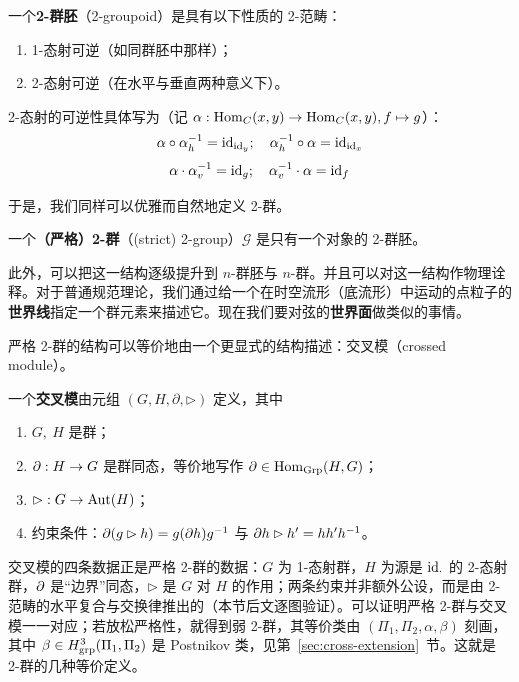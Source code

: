 \begin{definition}
一个\textbf{2-群胚}（2-groupoid）是具有以下性质的 2-范畴：
\begin{enumerate}
    \item 1-态射可逆（如同群胚中那样）；
    \item 2-态射可逆（在水平与垂直两种意义下）。
\end{enumerate}
2-态射的可逆性具体写为（记 $\alpha: {\rm Hom}_C(x,y)\to {\rm Hom}_C(x,y), f\mapsto g$）：
\[ \alpha\circ\alpha_h^{-1} = {\rm id}_{{\rm id}_y};\quad \alpha_h^{-1}\circ\alpha = {\rm id}_{{\rm id}_x}\]
\[ \alpha\cdot\alpha_v^{-1} = {\rm id}_g; \quad \alpha_v^{-1}\cdot \alpha = {\rm id}_f \]
\end{definition}

于是，我们同样可以优雅而自然地定义 2-群。

\begin{definition}
一个\textbf{（严格）2-群}（(strict) 2-group）$\mathcal{G}$ 是只有一个对象的 2-群胚。
\end{definition}

此外，可以把这一结构逐级提升到 $n$-群胚与 $n$-群。并且可以对这一结构作物理诠释。对于普通规范理论，我们通过给一个在时空流形（底流形）中运动的点粒子的\textbf{世界线}指定一个群元素来描述它。现在我们要对弦的\textbf{世界面}做类似的事情。

严格 2-群的结构可以等价地由一个更显式的结构描述：交叉模（crossed module）。

\begin{definition}
一个\textbf{交叉模}由元组 $(G,H,\partial ,\rhd)$ 定义，其中
\begin{enumerate}
    \item $G, \ H$ 是群；
    \item $\partial: H\to G$ 是群同态，等价地写作 $\partial\in{\rm Hom}_{\rm Grp}(H,G)$；
    \item $\rhd : G\to {\rm Aut}(H)$；
    \item 约束条件：$\partial(g\rhd h) = g(\partial h) g^{-1}$ 与 $\partial h\rhd h' = hh'h^{-1}$。
\end{enumerate}
\end{definition}

\begin{yizhu}
交叉模的四条数据正是严格 2-群的数据：$G$ 为 1-态射群，$H$ 为源是 ${\rm id}_\cdot$ 的 2-态射群，$\partial$ 是“边界”同态，$\rhd$ 是 $G$ 对 $H$ 的作用；两条约束并非额外公设，而是由 2-范畴的水平复合与交换律推出的（本节后文逐图验证）。可以证明严格 2-群与交叉模一一对应；若放松严格性，就得到弱 2-群，其等价类由 $(\Pi_1,\Pi_2,\alpha,\beta)$ 刻画，其中 $\beta\in H^3_{\rm grp}(\Pi_1,\Pi_2)$ 是 Postnikov 类，见第~\ref{sec:cross-extension}~节。这就是 2-群的几种等价定义。
\end{yizhu}


